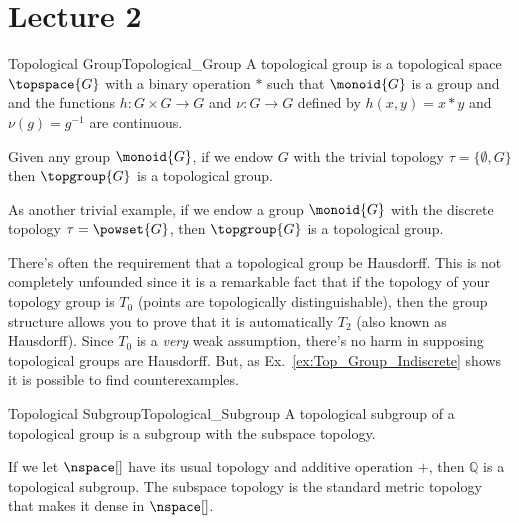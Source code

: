 \documentclass{book}                                                            %
\begin{document}
        \section{Lecture 2}
            \begin{fdefinition}{Topological Group}{Topological_Group}
                A topological group is a topological space $\topspace{G}$ with a
                binary operation $*$ such that $\monoid{G}$ is a group and and
                the functions $h:G\times{G}\rightarrow{G}$ and
                $\nu:G\rightarrow{G}$ defined by $h(x,y)=x*y$ and
                $\nu(g)=g^{\minus{1}}$ are continuous.
            \end{fdefinition}
            \begin{example}
                \label{ex:Top_Group_Indiscrete}%
                Given any group $\monoid{G}$, if we endow $G$ with the trivial
                topology $\tau=\{\emptyset,G\}$ then $\topgroup{G}$ is a
                topological group.
            \end{example}
            \begin{example}
                As another trivial example, if we endow a group $\monoid{G}$
                with the discrete topology $\tau=\powset{G}$, then
                $\topgroup{G}$ is a topological group. 
            \end{example}
            There's often the requirement that a topological group be Hausdorff.
            This is not completely unfounded since it is a remarkable fact that
            if the topology of your topology group is $T_{0}$ (points are
            topologically distinguishable), then the group structure allows you
            to prove that it is automatically $T_{2}$ (also known as Hausdorff).
            Since $T_{0}$ is a \textit{very} weak assumption, there's no harm in
            supposing topological groups are Hausdorff. But, as
            Ex.~\ref{ex:Top_Group_Indiscrete} shows it is possible to find
            counterexamples.
            \begin{fdefinition}{Topological Subgroup}{Topological_Subgroup}
                A topological subgroup of a topological group is a subgroup with
                the subspace topology.
            \end{fdefinition}
            \begin{example}
                If we let $\nspace[]$ have its usual topology and additive
                operation $+$, then $\mathbb{Q}$ is a topological subgroup. The
                subspace topology is the standard metric topology that makes it
                dense in $\nspace[]$.
            \end{example}
\end{document}
